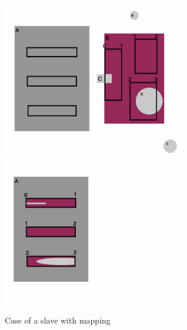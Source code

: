 \documentclass[a4paper]{article}
\begin{document}
\begin{figure}[h]
\begin{center}
\includegraphics[width=8cm]{img/mapping.png} \hspace*{2cm}
\includegraphics[width=4cm]{img/mapping2.png}
\caption{Case of a slave with mapping}
\label{fig:mapping}
\end{center}
\end{figure}




\end{document}
